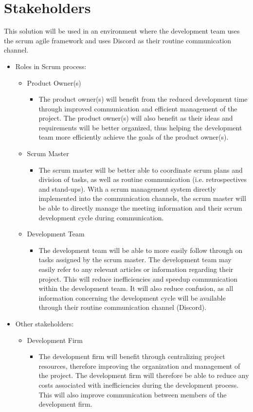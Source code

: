 \documentclass[12pt]{article}
\begin{document}
\section{Stakeholders}
This solution will be used in an environment where the development team uses the scrum agile framework and uses Discord as their routine communication channel.
\begin{itemize}
  \item Roles in Scrum process:
  \begin{itemize}
    \item Product Owner(s)
    \begin{itemize}
      \item[] The product owner(s) will benefit from the reduced development time through improved communication and efficient management of the project. The product owner(s) will also benefit as their ideas and requirements will be better organized, thus helping the development team more efficiently achieve the goals of the product owner(s).
    \end{itemize}
    \item Scrum Master
    \begin{itemize}
      \item[] The scrum master will be better able to coordinate scrum plans and division of tasks, as well as routine communication (i.e. retrospectives and stand-ups). With a scrum management system directly implemented into the communication channels, the scrum master will be able to directly manage the meeting information and their scrum development cycle during communication.
    \end{itemize}
    \item Development Team
    \begin{itemize}
      \item[] The development team will be able to more easily follow through on tasks assigned by the scrum master. The development team may easily refer to any relevant articles or information regarding their project. This will reduce inefficiencies and speedup communication within the development team. It will also reduce confusion, as all information concerning the development cycle will be available through their routine communication channel (Discord).
    \end{itemize}
  \end{itemize}
  \item Other stakeholders:
  \begin{itemize}
    \item Development Firm
    \begin{itemize}
      \item[] The development firm will benefit through centralizing project resources, therefore improving the organization and management of the project. The development firm will therefore be able to reduce any costs associated with inefficiencies during the development process. This will also improve communication between members of the development firm.
    \end{itemize}
  \end{itemize}
\end{itemize}
\end{document}
